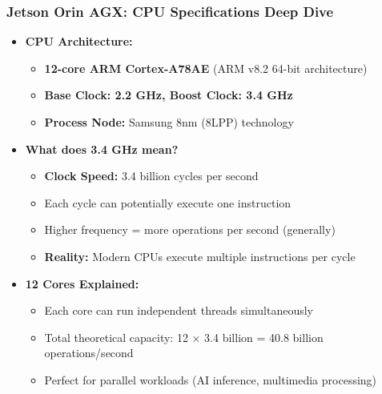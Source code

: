 \begin{frame}
\frametitle{Jetson Orin AGX: CPU Specifications Deep Dive}
\begin{itemize}
    \item \textbf{CPU Architecture:}
    \begin{itemize}
        \item \textbf{12-core ARM Cortex-A78AE} (ARM v8.2 64-bit architecture)
        \item \textbf{Base Clock: 2.2 GHz, Boost Clock: 3.4 GHz}
        \item \textbf{Process Node:} Samsung 8nm (8LPP) technology
    \end{itemize}
    \item \textbf{What does 3.4 GHz mean?}
    \begin{itemize}
        \item \textbf{Clock Speed:} 3.4 billion cycles per second
        \item Each cycle can potentially execute one instruction
        \item Higher frequency = more operations per second (generally)
        \item \textbf{Reality:} Modern CPUs execute multiple instructions per cycle
    \end{itemize}
    \item \textbf{12 Cores Explained:}
    \begin{itemize}
        \item Each core can run independent threads simultaneously
        \item Total theoretical capacity: 12 × 3.4 billion = 40.8 billion operations/second
        \item Perfect for parallel workloads (AI inference, multimedia processing)
    \end{itemize}
\end{itemize}
\end{frame}

